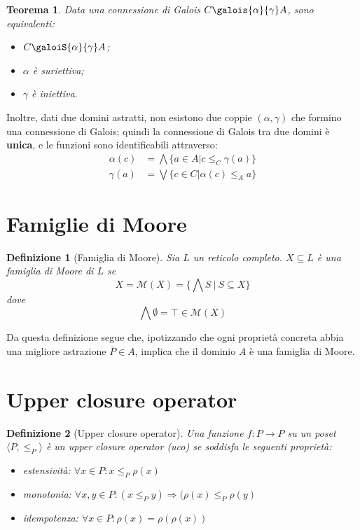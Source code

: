 \documentclass[a4paper, 10pt]{book}
\newtheorem{definit}{Definizione}[subsection]
\newtheorem{thm}{Teorema}[subsection]
\begin{document}
	\begin{thm}
		Data una connessione di Galois $ C \galois{\alpha}{\gamma} A$, sono equivalenti:
		\begin{itemize}
			\item $C \galoiS{\alpha}{\gamma} A$;
			\item $\alpha$ è suriettiva;
			\item $\gamma$ è iniettiva.
		\end{itemize}
	\end{thm}

	Inoltre, dati due domini astratti, non esistono due coppie $(\alpha, \gamma)$ che formino una connessione di Galois; quindi la connessione di Galois tra due domini è \textbf{unica}, e le funzioni sono identificabili attraverso:
	\begin{align*}
		\alpha(c) &= \bigwedge \lbrace a \in A \vert c \leq_C \gamma(a) \rbrace \\
		\gamma(a) &= \bigvee \lbrace c \in C \vert \alpha(c) \leq_A a \rbrace
	\end{align*}
	
	\section{Famiglie di Moore}
	\begin{definit}[Famiglia di Moore]
		Sia $L$ un reticolo completo. $X \subseteq L$ è una famiglia di Moore di $L$ se \[ X = \mathcal{M}(X) = \Big\{ \bigwedge S\ \vert\ S \subseteq X \Big\} \] dove \[ \bigwedge \emptyset = \top \in \mathcal{M}(X) \]
	\end{definit}
	
	Da questa definizione segue che, ipotizzando che ogni proprietà concreta abbia una migliore astrazione $\overline{P} \in A$, implica che il dominio $A$ è una famiglia di Moore.
	
	\section{Upper closure operator}
	\begin{definit}[Upper closure operator]
		Una funzione $f:P \to P$ su un poset $\langle P, \leq_P \rangle $ è un upper closure operator (uco) se soddisfa le seguenti proprietà:\begin{itemize}
			\item estensività: $\forall x \in P: x \leq_P \rho(x)$
			\item monotonia: $\forall x,y \in P: (x \leq_P y) \Rightarrow (\rho(x) \leq_P \rho(y)$
			\item idempotenza: $\forall x \in P: \rho(x) = \rho(\rho(x))$
		\end{itemize}
	\end{definit}
\end{document}
